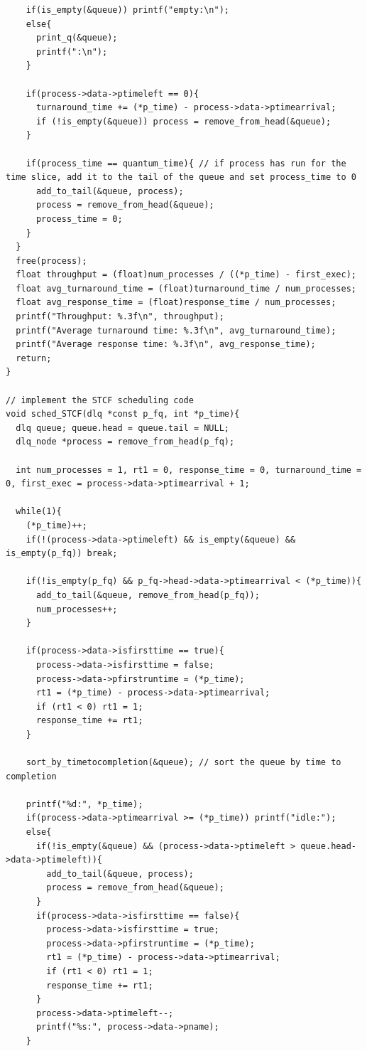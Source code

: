 \documentclass{article}
\theoremstyle{mytheoremstyle}
\theoremstyle{mytheoremstyle}
\theoremstyle{myproblemstyle}
\begin{document}
\begin{lstlisting}
    if(is_empty(&queue)) printf("empty:\n");
    else{
      print_q(&queue);
      printf(":\n");
    }

    if(process->data->ptimeleft == 0){
      turnaround_time += (*p_time) - process->data->ptimearrival;
      if (!is_empty(&queue)) process = remove_from_head(&queue);
    }

    if(process_time == quantum_time){ // if process has run for the time slice, add it to the tail of the queue and set process_time to 0
      add_to_tail(&queue, process);
      process = remove_from_head(&queue);
      process_time = 0;
    }
  }
  free(process);
  float throughput = (float)num_processes / ((*p_time) - first_exec);
  float avg_turnaround_time = (float)turnaround_time / num_processes;
  float avg_response_time = (float)response_time / num_processes;
  printf("Throughput: %.3f\n", throughput);
  printf("Average turnaround time: %.3f\n", avg_turnaround_time);
  printf("Average response time: %.3f\n", avg_response_time);
  return;
}

// implement the STCF scheduling code
void sched_STCF(dlq *const p_fq, int *p_time){
  dlq queue; queue.head = queue.tail = NULL;
  dlq_node *process = remove_from_head(p_fq);

  int num_processes = 1, rt1 = 0, response_time = 0, turnaround_time = 0, first_exec = process->data->ptimearrival + 1;

  while(1){
    (*p_time)++;
    if(!(process->data->ptimeleft) && is_empty(&queue) && is_empty(p_fq)) break;

    if(!is_empty(p_fq) && p_fq->head->data->ptimearrival < (*p_time)){
      add_to_tail(&queue, remove_from_head(p_fq));
      num_processes++;
    }

    if(process->data->isfirsttime == true){
      process->data->isfirsttime = false;
      process->data->pfirstruntime = (*p_time);
      rt1 = (*p_time) - process->data->ptimearrival;
      if (rt1 < 0) rt1 = 1;
      response_time += rt1;
    }

    sort_by_timetocompletion(&queue); // sort the queue by time to completion

    printf("%d:", *p_time);
    if(process->data->ptimearrival >= (*p_time)) printf("idle:");
    else{
      if(!is_empty(&queue) && (process->data->ptimeleft > queue.head->data->ptimeleft)){
        add_to_tail(&queue, process);
        process = remove_from_head(&queue);
      }
      if(process->data->isfirsttime == false){
        process->data->isfirsttime = true;
        process->data->pfirstruntime = (*p_time);
        rt1 = (*p_time) - process->data->ptimearrival;
        if (rt1 < 0) rt1 = 1;
        response_time += rt1;
      }
      process->data->ptimeleft--;
      printf("%s:", process->data->pname);
    }


\end{lstlisting}
\end{document}
